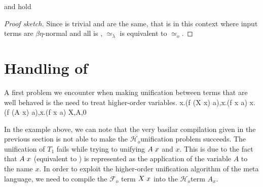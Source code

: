 \documentclass[sigconf,natbib=false,review]{acmart}
\newcommand{\appsep}{\ensuremath{\textcolor{lightgray}{\cdot}}}
\newcommand{\UnifRel}{\ensuremath{\simeq}}
\newcommand{\Uo}{\texorpdfstring{\ensuremath{\UnifRel_o}\xspace}{unif\_o}}
\newcommand{\Ue}{\ensuremath{\UnifRel_\lambda}\xspace}
\newcommand{\Fo}{\texorpdfstring{\ensuremath{\mathcal{F}_{\!o}\xspace}}{Fo}} %
\newcommand{\Ho}{\texorpdfstring{\ensuremath{\mathcal{H}_o}\xspace}{Ho}}
\begin{document}
\begin{theorem}  and
 hold
\end{theorem}
\begin{proof}[Proof sketch]
Since  is trivial \fstep and \hstep are the same, that is
in this
context where input terms are $\beta\eta$-normal and all is \wellb,
\Ue is equivalent to \Uo.
\end{proof}


  
\section{Handling of \maybebeta}\label{sec:llam}

A first problem we encounter when making unification between terms that are
well behaved is the need to treat higher-order variables. 
%
\printAlll
  {{{\lambda x.(f\appsep (X\appsep x)\appsep a),\lambda x.(f\appsep x\appsep a)}}}
  {{{\lambda x.(f\appsep (A\appsep x)\appsep a),\lambda x.(f\appsep x\appsep a)}}}
  {{{X,A,0}}}
  {{}}

In the example above, we can note that the very basilar compilation given in 
the previous section is not able to make the \Ho unification problem succeeds.
The unification of $T_1$ fails while trying to unifying $A \appsep x$ and $x$.
This is due to the fact that $A \appsep x$ (equivalent to )
is represented as the application of the variable $A$ to the name $x$.
In order to exploit the higher-order unification algorithm of the meta language,
we need to compile the \Fo{} term $X\appsep x$ into the \Ho term $A_x$.
\end{document}
